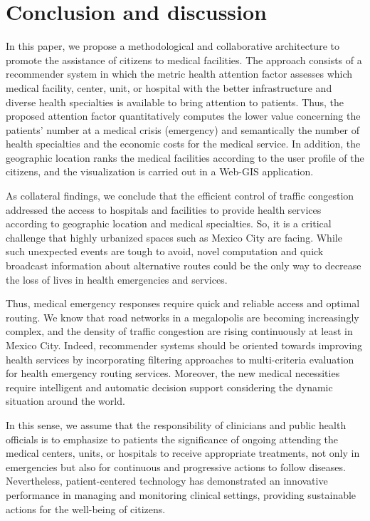 \documentclass[sustainability,article,submit,pdftex,moreauthors]{Definitions/mdpi}
\begin{document}
\section{Conclusion and discussion}
In this paper, we propose a methodological and collaborative architecture to promote the assistance of citizens to medical facilities. The approach consists of a recommender system in which the metric health attention factor assesses which medical facility, center, unit, or hospital with the better infrastructure and diverse health specialties is available to bring attention to patients. Thus, the proposed attention factor quantitatively computes the lower value concerning the patients' number at a medical crisis (emergency) and semantically the number of health specialties and the economic costs for the medical service. In addition, the geographic location ranks the medical facilities according to the user profile of the citizens, and the visualization is carried out in a Web-GIS application.

As collateral findings, we conclude that the efficient control of traffic congestion addressed the access to hospitals and facilities to provide health services according to geographic location and medical specialties. So, it is a critical challenge that highly urbanized spaces such as Mexico City are facing. While such unexpected events are tough to avoid, novel computation and quick broadcast information about alternative routes could be the only way to decrease the loss of lives in health emergencies and services. 

Thus, medical emergency responses require quick and reliable access and optimal routing. We know that road networks in a megalopolis are becoming increasingly complex, and the density of traffic congestion are rising continuously at least in Mexico City. Indeed, recommender systems should be oriented towards improving health services by incorporating filtering approaches to multi-criteria evaluation for health emergency routing services. Moreover, the new medical necessities require intelligent and automatic decision support considering the dynamic situation around the world.

In this sense, we assume that the responsibility of clinicians and public health officials is to emphasize to patients the significance of ongoing attending the medical centers, units, or hospitals to receive appropriate treatments, not only in emergencies but also for continuous and progressive actions to follow diseases. Nevertheless, patient-centered technology has demonstrated an innovative performance in managing and monitoring clinical settings, providing sustainable actions for the well-being of citizens.
\end{document}
